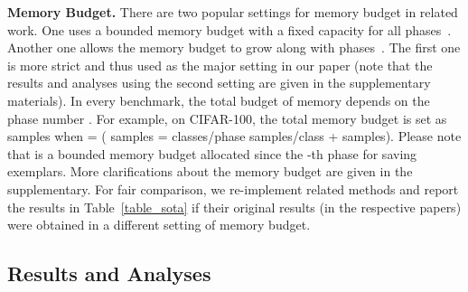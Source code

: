 \documentclass{article}
\newcommand{\myparagraph}[1]{\vspace{0.1em}\noindent\textbf{#1}}
\begin{document}
\myparagraph{Memory Budget.}
There are two popular settings for memory budget in related work. One uses a bounded memory budget with a fixed capacity for all phases~\cite{hou2019lucir,liu2020mnemonics,rebuffi2017icarl}. Another one allows the memory budget to grow along with phases~\cite{hou2019lucir,hu2021cil,Tao2020topology}.  
The first one is more strict and thus used as the major setting in our paper (note that the results and analyses using the second setting are given in the supplementary materials).
In every benchmark, the total budget of memory depends on the phase number .
For example, on CIFAR-100, the total memory budget is set as  samples when = ( samples =  classes/phase   samples/class +  samples). Please note that  is a bounded memory budget allocated since the -th phase for saving exemplars. 
More clarifications about the memory budget are given in the supplementary.
For fair comparison, we re-implement related methods and report the results in Table~\ref{table_sota} if their original results (in the respective papers) were obtained in a different setting of memory budget. 

\subsection{Results and Analyses}
\label{subsec_exp_analyses}
\end{document}

